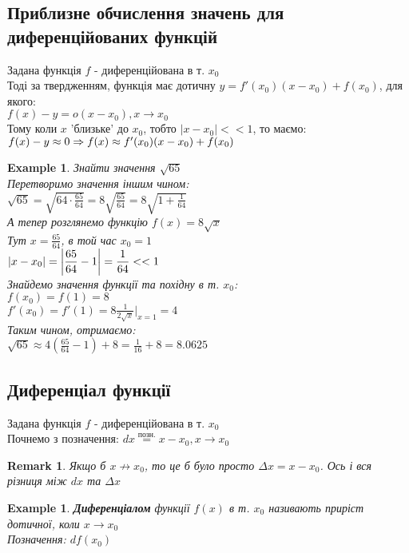 \documentclass[a4paper, 14pt]{extarticle}
\def\huge{\displaystyle}
\def\bigline{\vspace{5mm}\\}
\theoremstyle{theoremdd}
\theoremstyle{theoremdd}
\theoremstyle{theoremdd}
\theoremstyle{theoremdd}
\newtheorem{example}[theorem]{Example}
\theoremstyle{theoremdd}
\theoremstyle{theoremdd}
\newtheorem{remark}[theorem]{Remark}
\theoremstyle{theoremdd}
\theoremstyle{theoremdd}
\begin{document}
\subsection{Приблизне обчислення значень для диференційованих функцій}
Задана функція $f$ - диференційована в т. $x_0$\\
Тоді за твердженням, функція має дотичну $y = f'(x_0)(x-x_0)+f(x_0)$, для якого:\\
$f(x)-y = o(x-x_0), x \to x_0$\\
Тому коли $x$ 'близьке' до $x_0$, тобто $|x-x_0| <<1$, то маємо:\\
$f(x) -y \approx 0 \\ \Rightarrow f(x) \approx f'(x_0)(x-x_0)+f(x_0)$
\bigline
\begin{example} 
Знайти значення $\sqrt{65}$\\
Перетворимо значення іншим чином:\\
$\sqrt{65} \huge = \sqrt{64 \cdot \frac{65}{64}} = 8 \sqrt{\frac{65}{64}} = 8 \sqrt{1 + \frac{1}{64}}$\\
А тепер розглянемо функцію $f(x) = 8\sqrt{x}$\\
Тут $x = \huge \frac{65}{64}$, в той час $x_0 = 1$\\
$|x-x_0| = \huge \abs{\frac{65}{64} - 1} = \frac{1}{64} <<1$\\
Знайдемо значення функції та похідну в т. $x_0$:\\
$f(x_0) = f(1) = 8$\\
$f'(x_0) = f'(1) = \huge 8\frac{1}{2 \sqrt{x}} |_{x = 1} = 4$\\
Таким чином, отримаємо:\\
$\sqrt{65} \approx \huge 4\left(\frac{65}{64}-1\right)+8 = \frac{1}{16} + 8 = 8.0625$
\end{example}

\subsection{Диференціал функції}
Задана функція $f$ - диференційована в т. $x_0$\\
Почнемо з позначення: $dx \overset{\textrm{позн.}}{=} x-x_0, x \to x_0$\\
\begin{remark} 
Якщо б $x \not\to x_0$, то це б було просто $\Delta x = x - x_0$. Ось і вся різниця між $dx$ та $\Delta x$
\end{remark}

\begin{example}
\textbf{Диференціалом} функції $f(x)$ в т. $x_0$ називають приріст дотичної, коли $x \to x_0$\\
Позначення: $df(x_0)$
\end{example}
\end{document}
